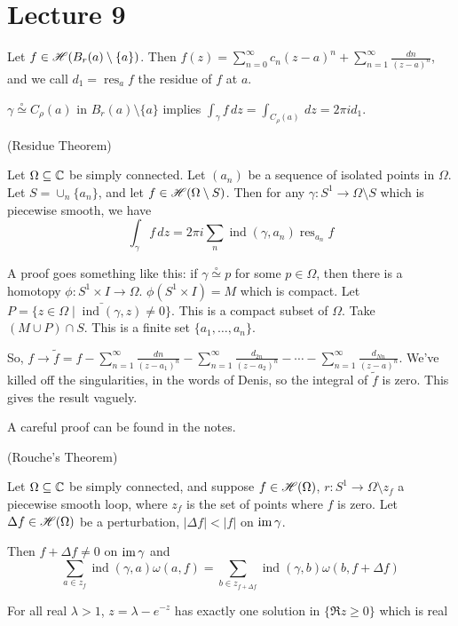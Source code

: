 \documentclass[x11names,reqno,14pt]{extarticle}
\newcommand{\oo}{{\infty}}
\DeclareMathOperator{\ind}{ind}
\DeclareMathOperator{\res}{res}
\begin{document}
\section*{Lecture 9}

Let $f \in \mathscr{H}(B_r(a)\setminus\{a\})$. Then $f(z) = \sum_{n=0}^\oo c_n(z - a)^n + \sum_{n=1}^\oo \frac{dn}{(z - a)^n}$, and we call $d_1 = \res_a f$ the residue of $f$ at $a$. 

$\gamma \overset{\circ}{\simeq} C_\rho(a)$ in $B_r(a)\setminus\{a\}$ implies $\int_\gamma f\,dz = \int_{C_\rho(a)}\,dz = 2\pi id_1$. 

\thm (Residue Theorem)

Let $\Omega\subseteq \mathbb{C}$ be simply connected. Let $(a_n)$ be a sequence of isolated points in $\Omega$. Let $S = \cup_n\{a_n\}$, and let $f \in \mathscr{H}(\Omega\setminus S)$. Then for any $\gamma:S^1\to\Omega\setminus S$ which is piecewise smooth, we have 
\[
\int_\gamma f\,dz = 2\pi i \sum_n\ind(\gamma, a_n)\res_{a_n}f
\]

\proof 

A proof goes something like this: if $\gamma \overset{\circ}{\simeq} p$ for some $p \in \Omega$, then there is a homotopy $\phi:S^1\times I \to \Omega$. $\phi(S^1\times I) = M$ which is compact. Let $P = \bar{\{z \in \Omega \mid \ind(\gamma, z) \neq0\}}$. This is a compact subset of $\Omega$. Take $(M \cup P) \cap S$. This is a finite set $\{a_1, \dots, a_n\}$. 

So, $f \to \tilde{f} = f - \sum_{n=1}^\oo\frac{dn}{(z - a_1)^n} - \sum_{n=1}^\oo\frac{d_{2n}}{(z - a_2)^n} - \cdots - \sum_{n=1}^\oo\frac{d_{Nn}}{(z - a)^n}$. We've killed off the singularities, in the words of Denis, so the integral of $\tilde{f}$ is zero. This gives the result vaguely. 

A careful proof can be found in the notes. 

\thm (Rouche's Theorem)

Let $\Omega\subseteq\mathbb{C}$ be simply connected, and suppose $f \in \mathscr{H}(\Omega)$, $r:S^1\to\Omega\setminus z_f$ a piecewise smooth loop, where $z_f$ is the set of points where $f$ is zero. Let $\Delta f \in \mathscr{H}(\Omega)$ be a perturbation, $|\Delta f|<|f|$ on $\operatorname{\mathrm{im}}\gamma$. 

Then $f + \Delta f \neq 0$ on $\operatorname{\mathrm{im}}\gamma$ and 
\[
\sum_{a \in z_f}\ind(\gamma, a)\omega(a, f) = \sum_{b\in z_{f + \Delta f}}\ind(\gamma, b)\omega(b, f + \Delta f)
\]

\exm

For all real $\lambda > 1$, $z = \lambda - e^{-z}$ has exactly one solution in $\{ \Re z \geq 0\}$ which is real
\end{document}
